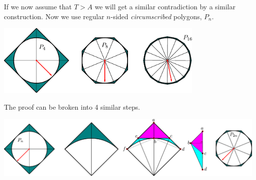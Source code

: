 If we now assume that $T>A$ we will get a similar contradiction by a similar
construction. Now we use regular $n$-sided \emph{circumscribed} polygons, $P_n$.
\begin{center}
 \includegraphics[height=35mm]{archimedes4}
\end{center}
The proof can be broken into 4 similar steps.
\begin{center}
 \includegraphics[width=\textwidth]{archimedes5}
\end{center}
